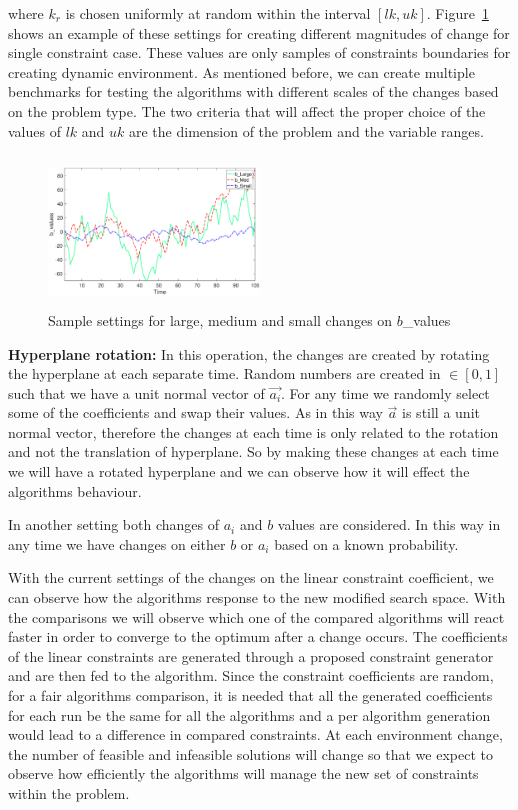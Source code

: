 \documentclass[conference]{IEEEtran}
\begin{document}
where 
$k_{r}$
is chosen uniformly at random within the interval $[lk,uk]$. Figure~\ref{fig:changesofb} shows an example of these settings for creating different magnitudes of change for single constraint case. 
These values are only samples of constraints boundaries for creating dynamic environment. As mentioned before, we can create multiple benchmarks for testing the algorithms with different scales of the changes based on the problem type. 
The two criteria that will affect the proper choice of the values of $lk$ and $uk$ are the dimension of the problem and the variable ranges.

 \begin{figure}[t]
        \centering          \includegraphics[width=0.5\textwidth, height=4cm]{changesofb.eps}  
        \caption[]
        {\scriptsize  Sample settings for large, medium and small changes on $b$\_values} 
        \label{fig:changesofb}
    \end{figure}
    
\textbf{Hyperplane rotation:}
In this operation, the changes are created by rotating the hyperplane at each separate time. Random numbers are created in $\in [0,1]$ such that we have a unit normal vector of $\vec{a_i}$.
For any time we randomly select some of the coefficients and swap their values. As in this way $\vec{a}$ is still a unit normal vector, therefore the changes at each time is only related to the rotation and not the translation of hyperplane. 
So by making these changes at each time we will have a rotated hyperplane and we can observe how it will effect the algorithms behaviour. 

In another setting both changes of $a_i$ and $b$ values are considered. In this way in any time we have changes on either $b$ or $a_i$ based on a known probability.

With the current settings of the changes on the linear constraint coefficient, we can observe how the algorithms response to the new modified search space. With the comparisons we will observe which one of the compared algorithms will react faster in order to converge to the optimum after a change occurs. 
The coefficients of the linear constraints are generated through a proposed constraint generator and are then fed to the algorithm. Since the constraint coefficients are random, for a fair algorithms comparison, it is needed that all the generated coefficients for each run be the same for all the algorithms and a per algorithm generation would lead to a difference in compared constraints.
At each environment change, the number of feasible and infeasible solutions will change so that we expect to observe how efficiently the algorithms will manage the new set of constraints within the problem.
\end{document}
